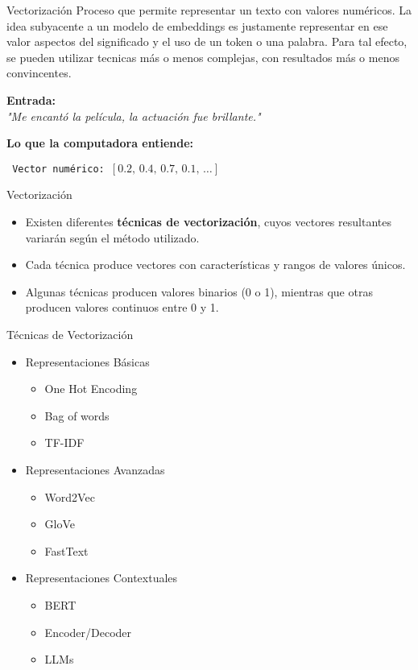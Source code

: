 \documentclass{beamer}
\begin{document}
\begin{frame}{Vectorización}
\text Proceso que permite representar un texto con valores numéricos. La idea subyacente a un modelo de embeddings es justamente representar en ese valor aspectos del significado y el uso de un token o una palabra. Para tal efecto, se pueden utilizar tecnicas más o menos complejas, con resultados más o menos convincentes.
 
\vspace{0.5cm}
\textbf{Entrada:} \\
\textit{"Me encantó la película, la actuación fue brillante."}

\vspace{1em}

\textbf{Lo que la computadora entiende:}


     \texttt{ Vector numérico: \([0.2,\, 0.4,\, 0.7,\, 0.1,\, \dots]\)}

 
\end{frame}


\begin{frame}{Vectorización}
\begin{itemize}
\item Existen diferentes \textbf{técnicas de vectorización}, cuyos vectores resultantes variarán según el método utilizado. 
\item Cada técnica produce vectores con características y rangos de valores únicos. 
\item Algunas técnicas producen valores binarios (0 o 1), mientras que otras producen valores continuos entre 0 y 1. 
\end{itemize}
\end{frame}


\begin{frame}{Técnicas de Vectorización}
\begin{itemize}
\item Representaciones Básicas 
	\begin{itemize}
        \item One Hot Encoding
        \item Bag of words
        \item TF-IDF
    \end{itemize}
\item Representaciones Avanzadas 
	\begin{itemize}
        \item Word2Vec
        \item GloVe
        \item FastText
    \end{itemize}
\item Representaciones Contextuales
	\begin{itemize}
        \item BERT
        \item Encoder/Decoder
        \item LLMs
    \end{itemize}
\end{itemize}
\end{frame}
\end{document}

